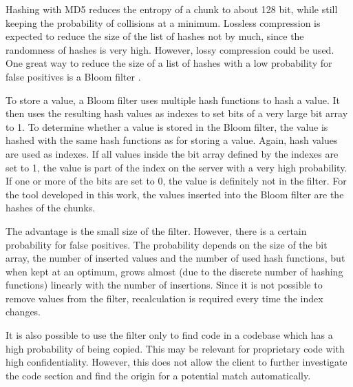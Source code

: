 Hashing with MD5 reduces the entropy of a chunk to about 128 bit, while still keeping the probability of collisions at a minimum.
Lossless compression is expected to reduce the size of the list of hashes not by much, since the randomness of hashes is very high.
However, lossy compression could be used.
One great way to reduce the size of a list of hashes with a low probability for false positives is a Bloom filter \cite{bloom1970filter}.

To store a value, a Bloom filter uses multiple hash functions to hash a value.
It then uses the resulting hash values as indexes to set bits of a very large bit array to 1.
To determine whether a value is stored in the Bloom filter, the value is hashed with the same hash functions as for storing a value.
Again, hash values are used as indexes.
If all values inside the bit array defined by the indexes are set to 1, the value is part of the index on the server with a very high probability.
If one or more of the bits are set to 0, the value is definitely not in the filter.
For the tool developed in this work, the values inserted into the Bloom filter are the hashes of the chunks.

The advantage is the small size of the filter.
However, there is a certain probability for false positives.
The probability depends on the size of the bit array, the number of inserted values and the number of used hash functions, but when kept at an optimum, grows almost (due to the discrete number of hashing functions) linearly with the number of insertions.
Since it is not possible to remove values from the filter, recalculation is required every time the index changes.

It is also possible to use the filter only to find code in a codebase which has a high probability of being copied.
This may be relevant for proprietary code with high confidentiality.
However, this does not allow the client to further investigate the code section and find the origin for a potential match automatically.
	
